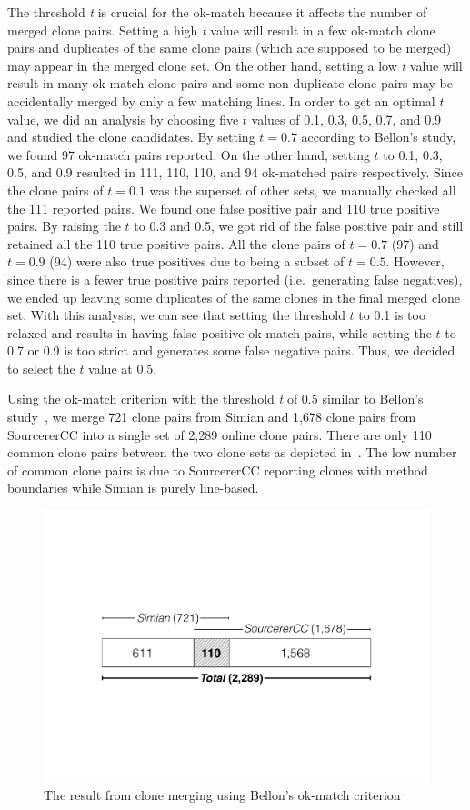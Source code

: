 \documentclass[10pt,journal,compsoc]{IEEEtran}
\begin{document}
The threshold \textit{t} is crucial for the ok-match because it affects the number
of merged clone pairs. Setting a high \textit{t} value will result in a few ok-match clone pairs
and duplicates of the same clone pairs (which are supposed to be merged) may appear in the merged
clone set. On the other hand, setting a low \textit{t} value will result in many ok-match clone
pairs and some non-duplicate clone pairs may be accidentally merged by only
a few matching lines.
In order to get an optimal $t$ value, we did an analysis by choosing
five $t$ values of 0.1, 0.3, 0.5, 0.7, and 0.9 and studied the clone candidates.
By setting $t=0.7$ according to Bellon's study, we
found 97 ok-match pairs reported. On the other hand, setting $t$ to 0.1, 0.3,
0.5, and 0.9 resulted in 111, 110, 110, and 94 ok-matched pairs respectively.
Since the clone pairs of $t=0.1$ was the superset of other sets,  we manually
checked all the 111 reported pairs. We found one false positive pair and 110
true positive pairs. By raising the $t$ to 0.3 and 0.5, we got rid of the false
positive pair and still retained all the 110 true positive pairs. All the clone
pairs of $t=0.7$ (97) and $t=0.9$ (94) were also true positives due to being a
subset of $t=0.5$. However, since there is a fewer true positive pairs reported
(i.e.~generating false negatives), we ended up leaving some duplicates of the 
same clones in the final merged clone set.
With this analysis, we can see that setting the threshold $t$ to 0.1 is too
relaxed and results in having false positive ok-match pairs, while setting the
$t$ to 0.7 or 0.9 is too strict and generates some false negative pairs. Thus,
we decided to select the $t$ value at 0.5. 

Using the ok-match criterion with the threshold \textit{t} of 0.5
similar to Bellon's study~\cite{Bellon2007}, we merge 721 clone pairs from
Simian and 1,678 clone pairs from SourcererCC into a single set of 2,289 online
clone pairs. There are only 110 common clone pairs between the two clone sets 
as depicted in~.  The low number of common
clone pairs is due to SourcererCC reporting clones with method
boundaries while Simian is purely line-based.

\begin{figure}
	\centering
	\includegraphics[width=0.8\linewidth]{clone_merging}
	\caption{The result from clone merging using Bellon's ok-match criterion}
	\label{fig:clonemerging}
\end{figure}
\end{document}
